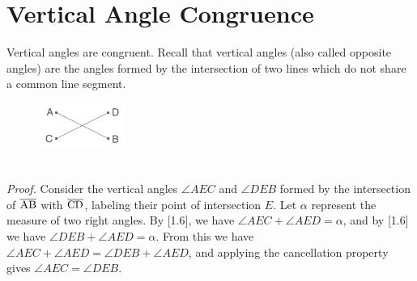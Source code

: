 \documentclass{report}
\begin{document}
\section{Vertical Angle Congruence}
Vertical angles are congruent. Recall that vertical angles (also called opposite angles) are the angles formed by the intersection of two lines which do not share a common line segment.
\\
\begin{figure} %
    \centering
    \includegraphics[width=0.25\textwidth]{vert}
\end{figure}
\\[\baselineskip]
\textit{Proof.} Consider the vertical angles $\angle AEC$ and $\angle DEB$ formed by the intersection of $\overline{\rm AB}$ with $\overline{\rm CD}$, labeling their point of intersection $E$. Let $\alpha$ represent the measure of two right angles. By [1.6], we have $\angle AEC + \angle AED = \alpha$, and by [1.6] we have $\angle DEB + \angle AED = \alpha$. From this we have $\angle AEC + \angle AED = \angle DEB + \angle AED$, and applying the cancellation property gives $\angle AEC = \angle DEB$.
\end{document}
